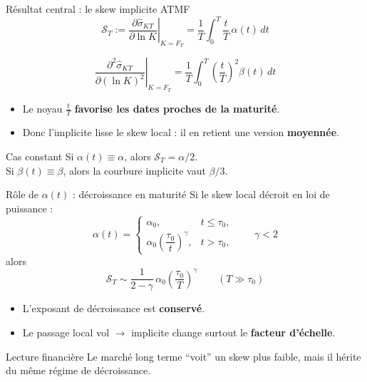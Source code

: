 \begin{frame}{Résultat central : le skew implicite ATMF}
\small
\[
\mathcal{S}_T
:=
\left.
\frac{\partial \hat{\sigma}_{KT}}{\partial \ln K}
\right|_{K=F_T}

=
\frac{1}{T}\int_0^T \frac{t}{T}\,\alpha(t)\,dt
\]

\[
\left.
\frac{\partial^2 \hat{\sigma}_{KT}}{\partial (\ln K)^2}
\right|_{K=F_T}
=
\frac{1}{T}\int_0^T\left(\frac{t}{T}\right)^2\beta(t)\,dt
\]

\begin{itemize}
    \item Le noyau \(\tfrac{t}{T}\) \textbf{favorise les dates proches de la maturité}.
    \item Donc l'implicite lisse le skew local : il en retient une version \textbf{moyennée}.
\end{itemize}

\begin{alertblock}{Cas constant}
Si \(\alpha(t)\equiv \alpha\), alors \(\mathcal{S}_T=\alpha/2\). \\
Si \(\beta(t)\equiv \beta\), alors la courbure implicite vaut \(\beta/3\).
\end{alertblock}
\end{frame}

\begin{frame}{Rôle de \(\alpha(t)\) : décroissance en maturité}
\small
Si le skew local décroit en loi de puissance :
\[
\alpha(t)=
\begin{cases}
\alpha_0, & t\le \tau_0,\\[0.2cm]
\alpha_0\left(\dfrac{\tau_0}{t}\right)^\gamma, & t>\tau_0,
\end{cases}
\qquad \gamma<2
\]
alors
\[
\mathcal{S}_T
\sim
\frac{1}{2-\gamma}\,\alpha_0\left(\frac{\tau_0}{T}\right)^\gamma
\qquad (T\gg\tau_0)
\]

\begin{itemize}
    \item L'exposant de décroissance est \textbf{conservé}.
    \item Le passage local vol \(\to\) implicite change surtout le \textbf{facteur d'échelle}.
\end{itemize}

\begin{block}{Lecture financière}
Le marché long terme ``voit'' un skew plus faible, mais il hérite du même régime de décroissance.
\end{block}
\end{frame}

